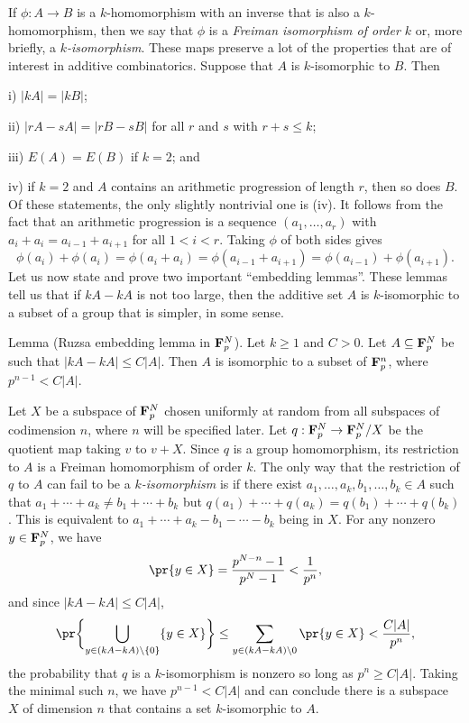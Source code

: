 If $\phi : A\to B$ is a $k$-homomorphism with an inverse that is also a $k$-homomorphism, then we say that
$\phi$ is a {\it Freiman isomorphism of order $k$} or, more briefly, a {\it $k$-isomorphism}. These
maps preserve a lot of the properties that are of interest in additive combinatorics. Suppose that $A$
is $k$-isomorphic to $B$. Then
\medskip
\item{i)} $|kA| = |kB|$;
\smallskip
\item{ii)} $|rA-sA| = |rB-sB|$ for all $r$ and $s$ with $r+s\le k$;
\smallskip
\item{iii)} $E(A) = E(B)$ if $k=2$; and
\smallskip
\item{iv)} if $k=2$ and $A$ contains an arithmetic progression of length $r$, then so does $B$.
\medskip
Of these statements, the only slightly nontrivial one is (iv). It follows from the fact that an
arithmetic progression is a sequence $(a_1,\ldots,a_r)$ with $a_i+a_i = a_{i-1}+a_{i+1}$ for all $1<i<r$.
Taking $\phi$ of both sides gives
$$\phi(a_i) + \phi(a_i) = \phi(a_i+a_i) = \phi(a_{i-1}+a_{i+1}) = \phi(a_{i-1}) + \phi(a_{i+1}).$$
Let us now state and prove two important ``embedding lemmas''. These lemmas tell us that if
$kA-kA$ is not too large, then the additive set $A$ is $k$-isomorphic to a subset of a group that
is simpler, in some sense.

\parenproclaim Lemma {\advthm} (Ruzsa embedding lemma in ${\bf F}_p^N$). Let $k\ge 1$ and $C>0$.
Let $A\subseteq {\bf F}_p^N$ be such that $|kA-kA|\le C|A|$. Then $A$ is isomorphic to a subset of
${\bf F}_p^n$, where $p^{n-1} < C|A|$.

\proof Let $X$ be a subspace of ${\bf F}_p^N$ chosen uniformly at random from all subspaces of
codimension $n$, where $n$ will be specified later. Let $q : {\bf F}_p^N \to {\bf F}_p^N/X$ be the
quotient map taking $v$ to $v+X$. Since $q$ is a group homomorphism, its restriction to $A$
is a Freiman homomorphism
of order $k$. The only way that the restriction of $q$ to $A$ can fail to be a {\it $k$-isomorphism}
is if there exist $a_1,\ldots,a_k,b_1,\ldots,b_k\in A$ such that $a_1+\cdots+a_k \ne b_1+\cdots+b_k$
but $q(a_1)+ \cdots + q(a_k) = q(b_1)+\cdots+q(b_k)$. This is equivalent to
$a_1+\cdots+a_k - b_1-\cdots-b_k$ being in $X$. For any nonzero $y\in {\bf F}_p^N$, we have
$$\pr\{y\in X\} = {p^{N-n}-1\over p^N-1} < {1\over p^n},$$
and since $|kA-kA|\le C|A|$,
$$\pr\biggl\{\bigcup_{y\in (kA-kA)\setminus\{0\}} \{y\in X\}\biggr\} \le \sum_{y\in (kA-kA)\setminus 0}
\pr\{y\in X\} < {C|A|\over p^n},$$
the probability that $q$ is a $k$-isomorphism is nonzero so long as $p^n\ge C|A|$. Taking the minimal such $n$,
we have $p^{n-1} < C|A|$ and
can conclude there is a subspace $X$ of dimension $n$ that contains a set $k$-isomorphic to $A$.\slug


